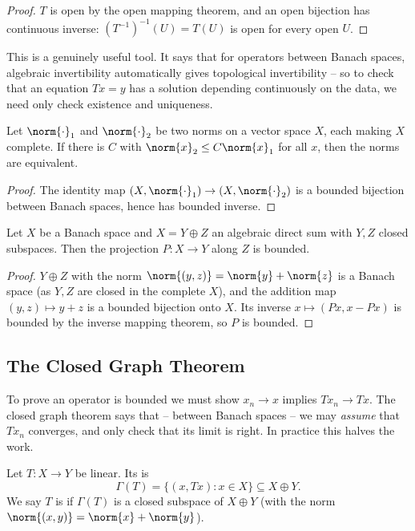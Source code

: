 \begin{proof}
	$T$ is open by the open mapping theorem, and an open bijection has continuous inverse: $(T^{-1})^{-1}(U) = T(U)$ is open for every open $U$.
\end{proof}

This is a genuinely useful tool. It says that for operators between Banach spaces, algebraic invertibility automatically gives topological invertibility -- so to check that an equation $Tx = y$ has a solution depending continuously on the data, we need only check existence and uniqueness.

\begin{corollary}
	Let $\norm{\cdot}_1$ and $\norm{\cdot}_2$ be two norms on a vector space $X$, each making $X$ complete. If there is $C$ with $\norm{x}_2 \leq C\norm{x}_1$ for all $x$, then the norms are equivalent.
\end{corollary}

\begin{proof}
	The identity map $(X, \norm{\cdot}_1) \to (X, \norm{\cdot}_2)$ is a bounded bijection between Banach spaces, hence has bounded inverse.
\end{proof}

\begin{corollary}
	Let $X$ be a Banach space and $X = Y \oplus Z$ an algebraic direct sum with $Y, Z$ closed subspaces. Then the projection $P : X \to Y$ along $Z$ is bounded.
\end{corollary}

\begin{proof}
	$Y \oplus Z$ with the norm $\norm{(y,z)} = \norm{y} + \norm{z}$ is a Banach space (as $Y, Z$ are closed in the complete $X$), and the addition map $(y,z) \mapsto y+z$ is a bounded bijection onto $X$. Its inverse $x \mapsto (Px, x - Px)$ is bounded by the inverse mapping theorem, so $P$ is bounded.
\end{proof}

\subsection{The Closed Graph Theorem}

To prove an operator is bounded we must show $x_n \to x$ implies $Tx_n \to Tx$. The closed graph theorem says that -- between Banach spaces -- we may \emph{assume} that $Tx_n$ converges, and only check that its limit is right. In practice this halves the work.

\begin{definition}[Graph]
	Let $T : X \to Y$ be linear. Its  is
	$$\Gamma(T) = \{ (x, Tx) : x \in X \} \subseteq X \oplus Y.$$
	We say $T$ is  if $\Gamma(T)$ is a closed subspace of $X \oplus Y$ (with the norm $\norm{(x,y)} = \norm{x} + \norm{y}$).
\end{definition}

